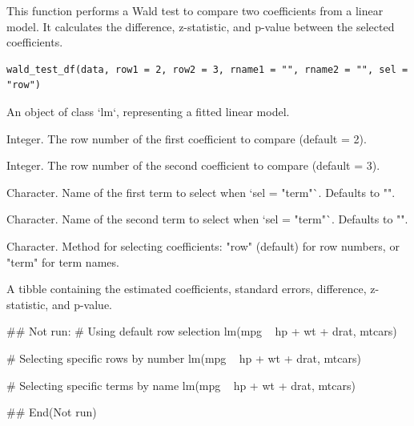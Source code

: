 \documentclass[a4paper]{book}
\begin{document}
%
\begin{Description}
This function performs a Wald test to compare two coefficients from a linear model.
It calculates the difference, z-statistic, and p-value between the selected coefficients.
\end{Description}
%
\begin{Usage}
\begin{verbatim}
wald_test_df(data, row1 = 2, row2 = 3, rname1 = "", rname2 = "", sel = "row")
\end{verbatim}
\end{Usage}
%
\begin{Arguments}
\begin{ldescription}
\item[\code{data}] An object of class `lm`, representing a fitted linear model.

\item[\code{row1}] Integer. The row number of the first coefficient to compare (default = 2).

\item[\code{row2}] Integer. The row number of the second coefficient to compare (default = 3).

\item[\code{rname1}] Character. Name of the first term to select when `sel = "term"`. Defaults to "".

\item[\code{rname2}] Character. Name of the second term to select when `sel = "term"`. Defaults to "".

\item[\code{sel}] Character. Method for selecting coefficients: "row" (default) for row numbers,
or "term" for term names.
\end{ldescription}
\end{Arguments}
%
\begin{Value}
A tibble containing the estimated coefficients, standard errors, difference, z-statistic,
and p-value.
\end{Value}
%
\begin{Examples}
\begin{ExampleCode}
\#\# Not run: 
# Using default row selection
lm(mpg ~ hp + wt + drat, mtcars) %

# Selecting specific rows by number
lm(mpg ~ hp + wt + drat, mtcars) %

# Selecting specific terms by name
lm(mpg ~ hp + wt + drat, mtcars) %

## End(Not run)
\end{ExampleCode}
\end{Examples}
\end{document}
